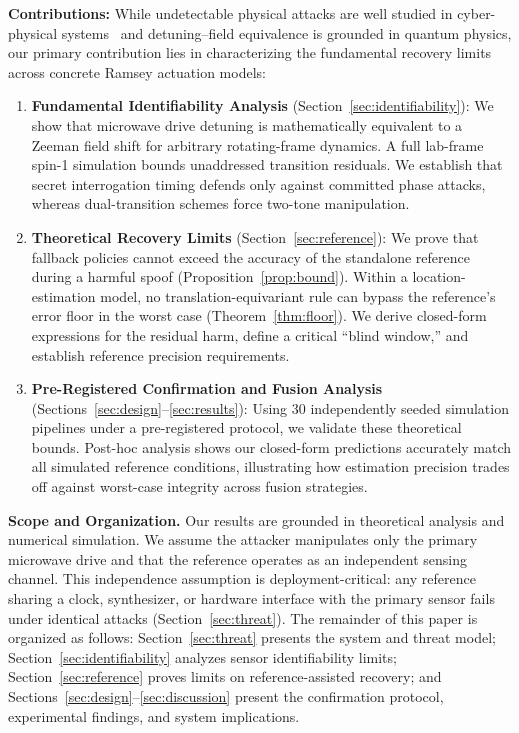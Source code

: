 \documentclass[conference]{IEEEtran}
\begin{document}
\textbf{Contributions:} While undetectable physical attacks are well studied in cyber-physical systems~\cite{pasqualetti2013attack} and detuning--field equivalence is grounded in quantum physics, our primary contribution lies in characterizing the fundamental recovery limits across concrete Ramsey actuation models:
\begin{enumerate}
\item \textbf{Fundamental Identifiability Analysis} (Section~\ref{sec:identifiability}): We show that microwave drive detuning is mathematically equivalent to a Zeeman field shift for arbitrary rotating-frame dynamics. A full lab-frame spin-1 simulation bounds unaddressed transition residuals. We establish that secret interrogation timing defends only against committed phase attacks, whereas dual-transition schemes force two-tone manipulation.
\item \textbf{Theoretical Recovery Limits} (Section~\ref{sec:reference}): We prove that fallback policies cannot exceed the accuracy of the standalone reference during a harmful spoof (Proposition~\ref{prop:bound}). Within a location-estimation model, no translation-equivariant rule can bypass the reference's error floor in the worst case (Theorem~\ref{thm:floor}). We derive closed-form expressions for the residual harm, define a critical ``blind window,'' and establish reference precision requirements.
\item \textbf{Pre-Registered Confirmation and Fusion Analysis} (Sections~\ref{sec:design}--\ref{sec:results}): Using 30 independently seeded simulation pipelines under a pre-registered protocol, we validate these theoretical bounds. Post-hoc analysis shows our closed-form predictions accurately match all \TheoryConditions{} simulated reference conditions, illustrating how estimation precision trades off against worst-case integrity across fusion strategies.
\end{enumerate}

\textbf{Scope and Organization.} Our results are grounded in theoretical analysis and numerical simulation.
We assume the attacker manipulates only the primary microwave drive and that the reference operates as an independent sensing channel. This independence assumption is deployment-critical: any reference sharing a clock, synthesizer, or hardware interface with the primary sensor fails under identical attacks (Section~\ref{sec:threat}). The remainder of this paper is organized as follows: Section~\ref{sec:threat} presents the system and threat model; Section~\ref{sec:identifiability} analyzes sensor identifiability limits; Section~\ref{sec:reference} proves limits on reference-assisted recovery; and Sections~\ref{sec:design}--\ref{sec:discussion} present the confirmation protocol, experimental findings, and system implications.
\end{document}
